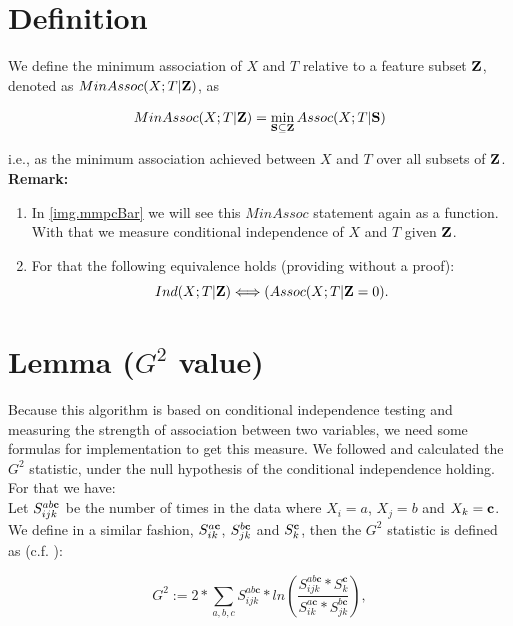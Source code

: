 	\section*{Definition} \label{s.Def9}

		We define the minimum association of $X$ and $T$ relative to a feature subset ${\textbf{Z}}$, denoted as $MinAssoc(X; T | {\textbf{Z}})$, as

		\begin{equation}
			MinAssoc (X; T | {\textbf{Z}}) = \min_{{\textbf{S}} \subseteq {\textbf{Z}}} Assoc(X; T | {\textbf{S}})
		\end{equation}

		i.e., as the minimum association achieved between $X$ and $T$ over all subsets of ${\textbf{Z}}$. \\
		\textbf{Remark:}
		\begin{enumerate}
			\item In \autoref{img.mmpcBar} we will see this $MinAssoc$ statement again as a function. With that we measure conditional independence of $X$ and $T$ given ${\textbf{Z}}$.
			\item For that the following equivalence holds (providing without a proof): 
				\begin{equation}
					Ind(X; T | {\textbf{Z}}) \Longleftrightarrow (Assoc(X; T | {\textbf{Z}} = 0).
				\end{equation}
		\end{enumerate}

	\section*{Lemma ($G^{2}$ value)} \label{s.g2}

		Because this algorithm is based on conditional independence testing and measuring the strength of association between two variables, we need some formulas for implementation to get this measure. We followed \cite{SGSN} and calculated the $G^{2}$ statistic, under the null hypothesis of the conditional independence holding. For that we have:\\
		Let $S_{ijk}^{ab{\textbf{c}}}$ be the number of times in the data where $X_{i} = a$, $X_{j} = b$ and $X_{k} = {\textbf{c}}$. We define in a similar fashion, $S_{ik}^{a{\textbf{c}}}$, $S_{jk}^{b{\textbf{c}}}$  and $S_{k}^{{\textbf{c}}}$, then the $G^{2}$ statistic is defined as (c.f. \cite{SGSN}):

		\begin{equation}
			G^{2} := 2 * \sum_{a,b,c} S^{ab\textbf{c}}_{ijk} * ln \left( \frac{S^{ab\textbf{c}}_{ijk}*S^{\textbf{c}}_{k}}{S^{a\textbf{c}}_{ik}*S^{b\textbf{c}}_{jk}} \right),
		\end{equation}

